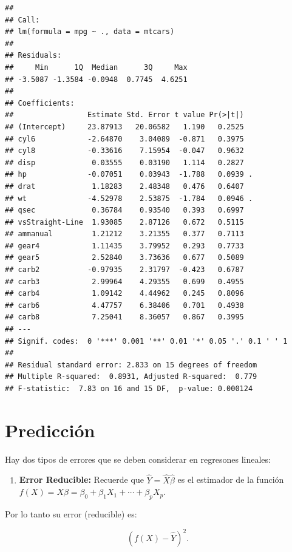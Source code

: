 \documentclass[
  12pt,
]{book}
\providecommand{\tightlist}{%
  \setlength{\itemsep}{0pt}\setlength{\parskip}{0pt}}
\theoremstyle{definition}
\theoremstyle{definition}
\theoremstyle{definition}
\theoremstyle{remark}
\begin{document}
\begin{verbatim}
## 
## Call:
## lm(formula = mpg ~ ., data = mtcars)
## 
## Residuals:
##     Min      1Q  Median      3Q     Max 
## -3.5087 -1.3584 -0.0948  0.7745  4.6251 
## 
## Coefficients:
##                 Estimate Std. Error t value Pr(>|t|)  
## (Intercept)     23.87913   20.06582   1.190   0.2525  
## cyl6            -2.64870    3.04089  -0.871   0.3975  
## cyl8            -0.33616    7.15954  -0.047   0.9632  
## disp             0.03555    0.03190   1.114   0.2827  
## hp              -0.07051    0.03943  -1.788   0.0939 .
## drat             1.18283    2.48348   0.476   0.6407  
## wt              -4.52978    2.53875  -1.784   0.0946 .
## qsec             0.36784    0.93540   0.393   0.6997  
## vsStraight-Line  1.93085    2.87126   0.672   0.5115  
## ammanual         1.21212    3.21355   0.377   0.7113  
## gear4            1.11435    3.79952   0.293   0.7733  
## gear5            2.52840    3.73636   0.677   0.5089  
## carb2           -0.97935    2.31797  -0.423   0.6787  
## carb3            2.99964    4.29355   0.699   0.4955  
## carb4            1.09142    4.44962   0.245   0.8096  
## carb6            4.47757    6.38406   0.701   0.4938  
## carb8            7.25041    8.36057   0.867   0.3995  
## ---
## Signif. codes:  0 '***' 0.001 '**' 0.01 '*' 0.05 '.' 0.1 ' ' 1
## 
## Residual standard error: 2.833 on 15 degrees of freedom
## Multiple R-squared:  0.8931, Adjusted R-squared:  0.779 
## F-statistic:  7.83 on 16 and 15 DF,  p-value: 0.000124
\end{verbatim}

\hypertarget{predicciuxf3n}{%
\section{Predicción}\label{predicciuxf3n}}

Hay dos tipos de errores que se deben considerar en regresones lineales:

\begin{enumerate}
\def\labelenumi{\arabic{enumi}.}
\tightlist
\item
  \textbf{Error Reducible:} Recuerde que \(\hat{Y} = \hat{X}\hat{\beta}\) es el estimador de la función \(f(X)=X\beta = \beta_{0} + \beta_{1}X_{1}+\cdots+\beta_{p}X_{p}\).
\end{enumerate}

Por lo tanto su error (reducible) es:

\begin{equation*}
\left(  f(X) - \hat{Y}\right) ^{2}. 
\end{equation*}
\end{document}
